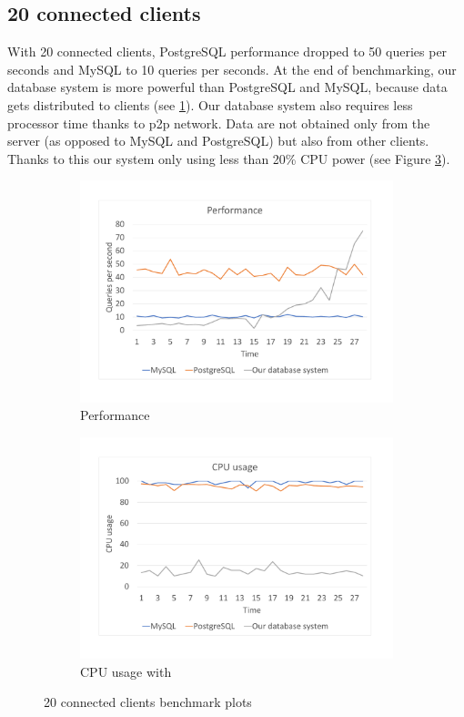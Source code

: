 \subsection{20 connected clients}
With 20 connected clients, PostgreSQL performance dropped to 50 queries per seconds and MySQL to 10 queries per seconds. At the end of benchmarking, our database system is more powerful than PostgreSQL and MySQL, because data gets distributed to clients (see \ref{bench20per}). Our database system also requires less processor time thanks to p2p network. Data are not obtained only from the server (as opposed to MySQL and PostgreSQL) but also from other clients. Thanks to this our system only using less than 20\% CPU power (see Figure \ref{bench20cpu}).

\begin{figure}[h]
    \begin{subfigure}{.5\textwidth}
        \centering
        \includegraphics[trim={1.78cm 2cm 2.08cm 1cm},clip,width=1.0\linewidth]{excel/20per.pdf}
        \caption{Performance}
        \label{bench20per}
    \end{subfigure}
    \begin{subfigure}{.5\textwidth}
        \centering
        \includegraphics[trim={1.78cm 2cm 2.08cm 1cm},clip,width=1.0\linewidth]{excel/20cpu.pdf}
        \caption{CPU usage with}
        \label{bench20cpu}
    \end{subfigure}
    \caption{20 connected clients benchmark plots}
\end{figure}


